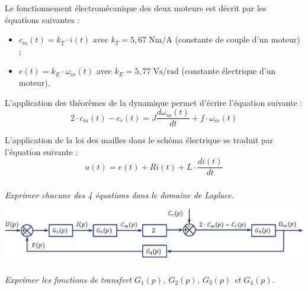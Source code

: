 \documentclass[10pt]{article}
\newif\ifprof
\begin{document}
\vspace{.25cm}
Le fonctionnement électromécanique des deux moteurs est décrit par les équations suivantes :
\begin{itemize}
\item $c_m (t)=k_T \cdot i(t)$ avec $k_T=5,67 \;\text{Nm/A}$ (constante de couple d’un moteur) ;
\item $e(t)=k_E \cdot \omega_m (t)$ avec $k_E=5,77 \; \text{Vs/rad}$ (constante électrique d’un moteur).
\end{itemize}

L’application des théorèmes de la dynamique permet d’écrire l'équation suivante : 
$$ 2\cdot c_m (t)-c_r (t)=J\dfrac{d\omega_m (t)}{dt}+f\cdot \omega_m (t)$$

L’application de la loi des mailles dans le schéma électrique se traduit par l’équation suivante :
$$u(t)=e(t)+Ri(t)+L \cdot \dfrac{di(t)}{dt}$$


\fi

\subparagraph{}
\textit{Exprimer chacune des 4 équations dans le domaine de Laplace.}
\ifprof
\begin{corrige}
\begin{enumerate}
\item $C_m (p)=k_T \cdot I(p)$
\item $E(p)=k_E \cdot \Omega_m (p)$
\item $ 2\cdot C_m (p)-C_r (p)=Jp\Omega_m (p)+f\cdot \Omega_m (p)$
\item $U(p)=E(p)+RI(p)+L p I(p)$
\end{enumerate}
\end{corrige}
\else
\fi

\ifprof
\else
\begin{center}
\includegraphics[width=.9\textwidth]{images/SchemaBloc_01}
\end{center}
\fi

\subparagraph{}
\textit{Exprimer les fonctions de transfert $G_1(p)$, $G_2(p)$, $G_3(p)$ et $G_4(p)$.}
\ifprof
\begin{corrige}
On a :
\begin{enumerate}
\item $G_1(p)= \dfrac{1}{R+Lp}$
\item $G_2(p) = k_T$
\item $G_3(p)=\dfrac{1}{Jp+f}$
\item $G_4(p) = k_E$
\end{enumerate}
\end{corrige}
\else
\fi
\end{document}
